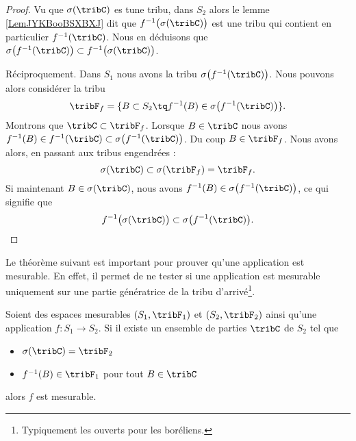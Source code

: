 \begin{proof}
    Vu que \( \sigma(\tribC)\) es tune tribu, dans \( S_2\) alors le lemme \ref{LemJYKBooBSXBXJ} dit que \( f^{-1}\big( \sigma(\tribC) \big)\) est une tribu qui contient en particulier \(  f^{-1}(\tribC) \). Nous en déduisons que \( \sigma\big( f^{-1}(\tribC) \big)\subset f^{-1}\big( \sigma(\tribC) \big)\).

    Réciproquement. Dans \( S_1\) nous avons la tribu \( \sigma\big( f^{-1}(\tribC) \big)\). Nous pouvons alors considérer la tribu
    \begin{equation}
        \tribF_f=\{ B\subset S_2\tq f^{-1}(B)\in\sigma\big( f^{-1}(\tribC) \big) \}.
    \end{equation}
    Montrons que \( \tribC\subset \tribF_f\). Lorsque \( B\in \tribC\) nous avons \( f^{-1}(B)\in f^{-1}(\tribC)\subset\sigma\big( f^{-1}(\tribC) \big)\). Du coup \( B\in \tribF_f\). Nous avons alors, en passant aux tribus engendrées :
    \begin{equation}
        \sigma(\tribC)\subset\sigma(\tribF_f)=\tribF_f.
    \end{equation}
    Si maintenant \( B\in\sigma(\tribC)\), nous avons \( f^{-1}(B)\in \sigma\big( f^{-1}(\tribC) \big)\), ce qui signifie que
    \begin{equation}
        f^{-1}\big( \sigma(\tribC) \big)\subset\sigma\big( f^{-1}(\tribC) \big).
    \end{equation}
\end{proof}

Le théorème suivant est important pour prouver qu'une application est mesurable. En effet, il permet de ne tester si une application est mesurable uniquement sur une partie génératrice de la tribu d'arrivé\footnote{Typiquement les ouverts pour les boréliens.}.
\begin{theorem}     \label{ThoECVAooDUxZrE}
    Soient des espaces mesurables \( ( S_1,\tribF_1 )\) et \( (S_2,\tribF_2)\) ainsi qu'une application \( f\colon S_1\to S_2\). Si il existe un ensemble de parties \( \tribC\) de \( S_2\) tel que
    \begin{itemize}
        \item \( \sigma(\tribC)=\tribF_2\)
        \item \( f^{-1}(B) \in \tribF_1 \) pour tout \( B\in \tribC\)
    \end{itemize}
    alors \( f\) est mesurable.
\end{theorem}

